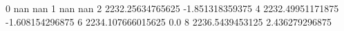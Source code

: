 0 nan nan
1 nan nan
2 2232.25634765625 -1.851318359375
4 2232.49951171875 -1.608154296875
6 2234.107666015625 0.0
8 2236.5439453125 2.436279296875
